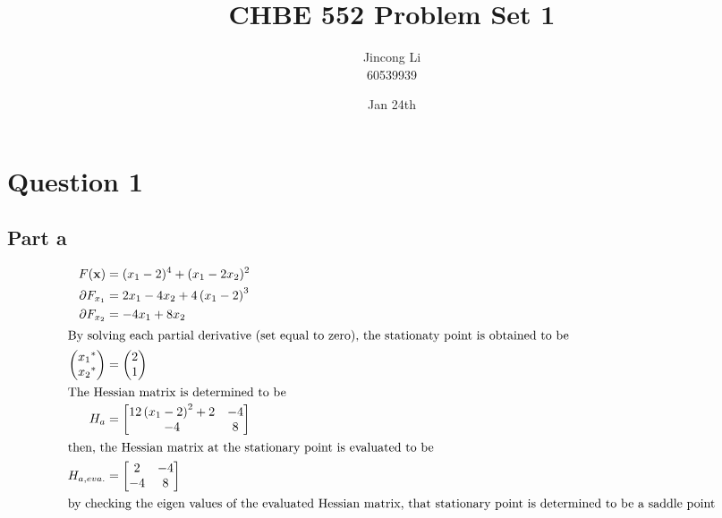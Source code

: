 \documentclass[a4paper,12pt]{article} %
\begin{document}
\newcommand{\vect}[1]{\mathbf{#1}}

\title{CHBE 552 Problem Set 1}
\author{Jincong Li \\ 60539939}
\date{Jan 24th}
\maketitle

\section{\textbf{Question 1}}

\subsection{Part a}

\begin{align*}
F( \vect{x} )  &= (x_1 - 2)^4 + (x_1-2x_2)^2 \\
\partial F_{x_1} &= 2 x_{1} - 4 x_{2} + 4 \left(x_{1} - 2\right)^{3} \\
\partial F_{x_2} &= -4x_1 + 8x_2\\
\intertext{By solving each partial derivative (set equal to zero), the stationaty point is obtained to be}
\begin{pmatrix} 
{x_1}^* \\ {x_2}^* 
\end{pmatrix}
&= 
\begin{pmatrix} 
2\\1
\end{pmatrix}
\\
\intertext{The Hessian matrix is determined to be}
H_a &= \left[\begin{matrix}12 \left(x_{1} - 2\right)^{2} + 2 & -4\\-4 & 8\end{matrix}\right]\\
\intertext{then, the Hessian matrix at the stationary point is evaluated to be}
H_{a,eva.}&=\left[\begin{matrix}2 & -4\\-4 & 8\end{matrix}\right]\\
\intertext{by checking the eigen values of the evaluated Hessian matrix, that stationary point is determined to be a saddle point}
\end{align*}
\end{document}
